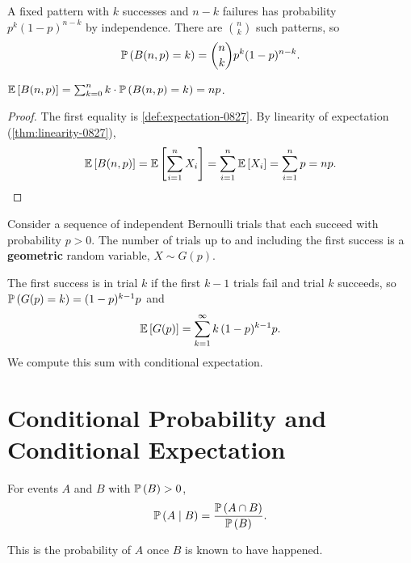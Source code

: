 A fixed pattern with $k$ successes and $n - k$ failures has probability $p^k (1 - p)^{n - k}$ by
independence. There are $\binom{n}{k}$ such patterns, so
\[\prob{B(n, p) = k} = \binom{n}{k} p^k (1 - p)^{n - k}.\]

\begin{theorem}\label{thm:binomial-0827}
    $\expectation{B(n, p)} = \sum_{k=0}^{n} k \cdot \prob{B(n, p) = k} = np$.
\end{theorem}

\begin{proof}
    The first equality is \cref{def:expectation-0827}. By linearity of expectation
    (\cref{thm:linearity-0827}),
    \[\expectation{B(n, p)} = \expectation{\sum_{i=1}^{n} X_i} = \sum_{i=1}^{n} \expectation{X_i}
        = \sum_{i=1}^{n} p = np.\]
\end{proof}

\begin{definition}\label{def:geometric-0827}
    Consider a sequence of independent Bernoulli trials that each succeed with probability $p > 0$.
    The number of trials up to and including the first success is a \textbf{geometric} random
    variable, $X \sim G(p)$.
\end{definition}

The first success is in trial $k$ if the first $k - 1$ trials fail and trial $k$ succeeds, so
$\prob{G(p) = k} = (1 - p)^{k - 1} p$ and
\[\expectation{G(p)} = \sum_{k=1}^{\infty} k \, (1 - p)^{k - 1} p.\]
We compute this sum with conditional expectation.

\section{Conditional Probability and Conditional Expectation}

\begin{definition}\label{def:condprob-0827}
    For events $A$ and $B$ with $\prob{B} > 0$,
    \[\prob{A \given B} = \frac{\prob{A \cap B}}{\prob{B}}.\]
\end{definition}

This is the probability of $A$ once $B$ is known to have happened.

